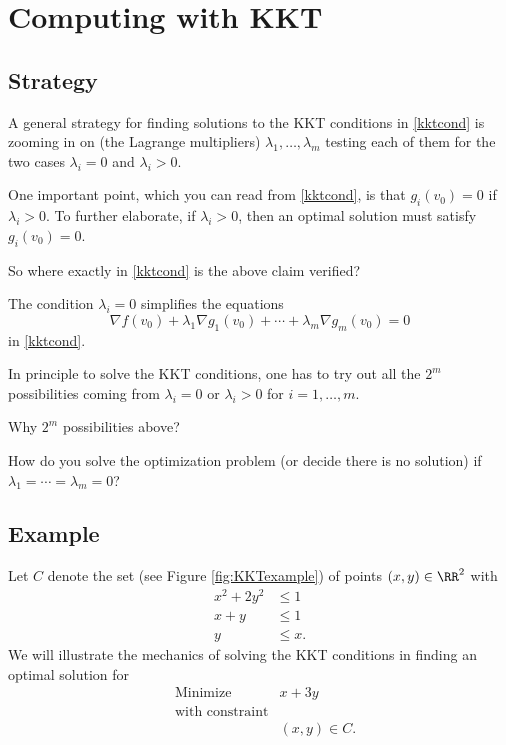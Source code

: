 \documentclass{article}
\begin{document}
\newcommand{\qtextq}[1]{\quad\text{#1}\quad}



\section{Computing with KKT}

\subsection{Strategy}

A general strategy for finding solutions to the KKT conditions in \eqref{kktcond}
is zooming in on (the Lagrange multipliers) $\lambda_1, \dots, \lambda_m$ testing
each of them for the two cases $\lambda_i = 0$ and $\lambda_i> 0$.

One important point, which you can read from \eqref{kktcond}, is
that $g_i(v_0) = 0$ if $\lambda_i > 0$. To further elaborate, if
$\lambda_i > 0$, then an optimal solution must satisfy $g_i(v_0) = 0$.

\beginshex
So where exactly in \eqref{kktcond} is the above claim verified?
\endshex

The condition $\lambda_i = 0$ simplifies the equations
$$
\nabla f(v_0) + \lambda_1 \nabla g_1(v_0) + \cdots + \lambda_m
    \nabla g_m(v_0) = 0
$$
in \eqref{kktcond}.    

In principle to solve the KKT conditions, one has to try out all the
$2^m$ possibilities coming from $\lambda_i = 0$ or $\lambda_i > 0$ for $i=1, \dots, m$.

\beginshex
Why $2^m$ possibilities above?
\endshex

\beginshex
How do you solve the optimization problem (or decide there is no solution)
if $\lambda_1 = \cdots = \lambda_m = 0$?
\endshex



\subsection{Example}

Let $C$ denote the set
(see Figure \ref{fig:KKTexample}) of points $(x, y)\in \RR^2$ with
\begin{align*}
  x^2 + 2y^2 &\leq 1\\
  x + y &\leq 1\\
  y &\leq x.
\end{align*}
We will illustrate the mechanics of solving the KKT conditions in
finding an optimal solution for
  \begin{align}\label{eq:KKTex}
    &\text{Minimize} &x + 3 y\\
    &\text{with constraint}\\
    &&(x, y)\in C.
  \end{align}
\end{document}
